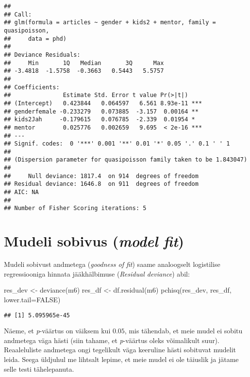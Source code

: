 \documentclass[
]{book}
\newenvironment{Shaded}{\begin{snugshade}}{\end{snugshade}}
\newcommand{\AttributeTok}[1]{\textcolor[rgb]{0.77,0.63,0.00}{#1}}
\newcommand{\ConstantTok}[1]{\textcolor[rgb]{0.00,0.00,0.00}{#1}}
\newcommand{\FunctionTok}[1]{\textcolor[rgb]{0.00,0.00,0.00}{#1}}
\newcommand{\NormalTok}[1]{#1}
\newcommand{\OtherTok}[1]{\textcolor[rgb]{0.56,0.35,0.01}{#1}}
\begin{document}
\begin{verbatim}
## 
## Call:
## glm(formula = articles ~ gender + kids2 + mentor, family = quasipoisson, 
##     data = phd)
## 
## Deviance Residuals: 
##     Min       1Q   Median       3Q      Max  
## -3.4818  -1.5758  -0.3663   0.5443   5.5757  
## 
## Coefficients:
##               Estimate Std. Error t value Pr(>|t|)    
## (Intercept)   0.423844   0.064597   6.561 8.93e-11 ***
## genderfemale -0.233279   0.073885  -3.157  0.00164 ** 
## kids2Jah     -0.179615   0.076785  -2.339  0.01954 *  
## mentor        0.025776   0.002659   9.695  < 2e-16 ***
## ---
## Signif. codes:  0 '***' 0.001 '**' 0.01 '*' 0.05 '.' 0.1 ' ' 1
## 
## (Dispersion parameter for quasipoisson family taken to be 1.843047)
## 
##     Null deviance: 1817.4  on 914  degrees of freedom
## Residual deviance: 1646.8  on 911  degrees of freedom
## AIC: NA
## 
## Number of Fisher Scoring iterations: 5
\end{verbatim}

\hypertarget{mudeli-sobivus-model-fit}{%
\section{\texorpdfstring{Mudeli sobivus (\emph{model fit})}{Mudeli sobivus (model fit)}}\label{mudeli-sobivus-model-fit}}

Mudeli sobivust andmetega (\emph{goodness of fit}) saame analoogselt logistilise regressiooniga hinnata jääkhälbimuse (\emph{Residual deviance}) abil:

\begin{Shaded}
\begin{Highlighting}[]
\NormalTok{res\_dev }\OtherTok{\textless{}{-}} \FunctionTok{deviance}\NormalTok{(m6)}
\NormalTok{res\_df }\OtherTok{\textless{}{-}} \FunctionTok{df.residual}\NormalTok{(m6)}
\FunctionTok{pchisq}\NormalTok{(res\_dev, res\_df, }\AttributeTok{lower.tail=}\ConstantTok{FALSE}\NormalTok{)}
\end{Highlighting}
\end{Shaded}

\begin{verbatim}
## [1] 5.095965e-45
\end{verbatim}

Näeme, et \emph{p}-väärtus on väiksem kui \(0.05\), mis tähendab, et meie mudel ei sobitu andmetega väga hästi (siin tahame, et \emph{p}-väärtus oleks võimalikult suur). Reaaleluliste andmetega ongi tegelikult väga keeruline hästi sobituvat mudelit leida. Seega üldjuhul me lihtsalt lepime, et meie mudel ei ole täiuslik ja jätame selle testi tähelepanuta.
\end{document}
